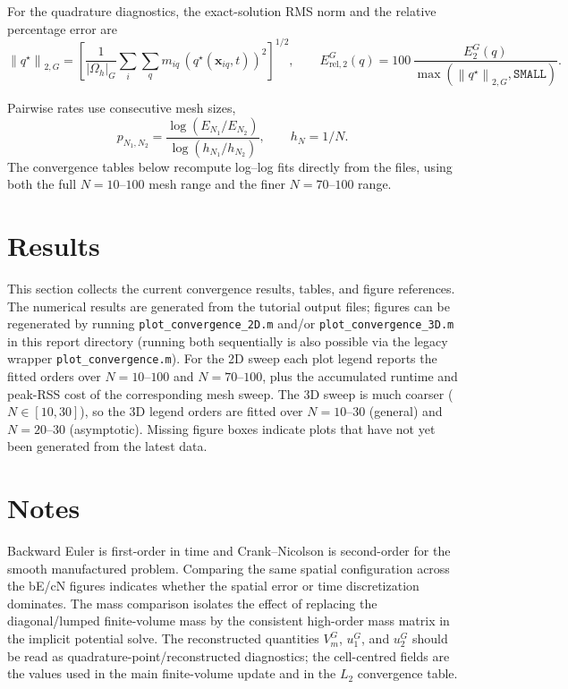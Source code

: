 \documentclass[11pt,a4paper]{article}
\newcommand{\code}[1]{\texttt{\small #1}}
\newcommand{\norm}[1]{\left\lVert #1 \right\rVert}
\begin{document}
For the quadrature diagnostics, the exact-solution RMS norm and the relative
percentage error are
\begin{equation}
  \norm{q^\star}_{2,G}
  =
  \left[
  \frac{1}{|\Omega_h|_G}
  \sum_i\sum_q m_{iq}\,
  \left(q^\star(\mathbf{x}_{iq},t)\right)^2
  \right]^{1/2},
  \qquad
  E_{\mathrm{rel},2}^{G}(q)
  =
  100\,\frac{E_2^G(q)}{\max(\norm{q^\star}_{2,G},\texttt{SMALL})}.
\end{equation}

Pairwise rates use consecutive mesh sizes,
\begin{equation}
p_{N_1,N_2} = \frac{\log(E_{N_1}/E_{N_2})}{\log(h_{N_1}/h_{N_2})}, \qquad h_N=1/N.
\end{equation}
The convergence tables below recompute log--log fits directly from the  files, using both the full $N=10$--$100$ mesh range and the finer $N=70$--$100$ range.


\section{Results}

This section collects the current convergence results, tables, and figure
references. The numerical results are generated from the tutorial output files;
figures can be regenerated by running \code{plot\_convergence\_2D.m} and/or
\code{plot\_convergence\_3D.m} in this report directory (running both
sequentially is also possible via the legacy wrapper \code{plot\_convergence.m}).
For the 2D sweep each plot legend reports the fitted orders over $N=10$--$100$
and $N=70$--$100$, plus the accumulated runtime and peak-RSS cost of the
corresponding mesh sweep. The 3D sweep is much coarser ($N\in[10,30]$), so
the 3D legend orders are fitted over $N=10$--$30$ (general) and $N=20$--$30$
(asymptotic). Missing figure boxes indicate plots that have not yet been
generated from the latest data.





\section{Notes}
Backward Euler is first-order in time and Crank--Nicolson is second-order for the smooth manufactured problem. Comparing the same spatial configuration across the bE/cN figures indicates whether the spatial error or time discretization dominates. The mass comparison isolates the effect of replacing the diagonal/lumped finite-volume mass by the consistent high-order mass matrix in the implicit potential solve. The reconstructed quantities $V_m^G$, $u_1^G$, and $u_2^G$ should be read as quadrature-point/reconstructed diagnostics; the cell-centred fields are the values used in the main finite-volume update and in the $L_2$ convergence table.
\end{document}
